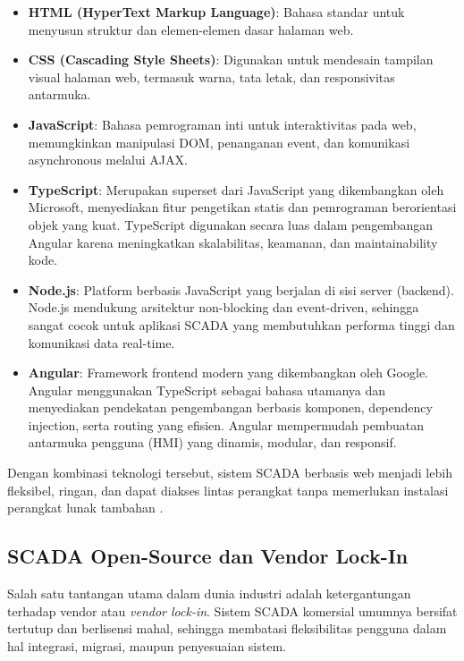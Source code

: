 \begin{itemize}
    \item \textbf{HTML (HyperText Markup Language)}: Bahasa standar untuk menyusun struktur dan elemen-elemen dasar halaman web.
    
    \item \textbf{CSS (Cascading Style Sheets)}: Digunakan untuk mendesain tampilan visual halaman web, termasuk warna, tata letak, dan responsivitas antarmuka.
    
    \item \textbf{JavaScript}: Bahasa pemrograman inti untuk interaktivitas pada web, memungkinkan manipulasi DOM, penanganan event, dan komunikasi asynchronous melalui AJAX.
    
    \item \textbf{TypeScript}: Merupakan superset dari JavaScript yang dikembangkan oleh Microsoft, menyediakan fitur pengetikan statis dan pemrograman berorientasi objek yang kuat. TypeScript digunakan secara luas dalam pengembangan Angular karena meningkatkan skalabilitas, keamanan, dan maintainability kode.
    
    \item \textbf{Node.js}: Platform berbasis JavaScript yang berjalan di sisi server (backend). Node.js mendukung arsitektur non-blocking dan event-driven, sehingga sangat cocok untuk aplikasi SCADA yang membutuhkan performa tinggi dan komunikasi data real-time.
    
    \item \textbf{Angular}: Framework frontend modern yang dikembangkan oleh Google. Angular menggunakan TypeScript sebagai bahasa utamanya dan menyediakan pendekatan pengembangan berbasis komponen, dependency injection, serta routing yang efisien. Angular mempermudah pembuatan antarmuka pengguna (HMI) yang dinamis, modular, dan responsif.
\end{itemize}

Dengan kombinasi teknologi tersebut, sistem SCADA berbasis web menjadi lebih fleksibel, ringan, dan dapat diakses lintas perangkat tanpa memerlukan instalasi perangkat lunak tambahan \parencite{seeed2024fuxa}.

\subsection{SCADA Open-Source dan Vendor Lock-In}
Salah satu tantangan utama dalam dunia industri adalah ketergantungan terhadap vendor atau \textit{vendor lock-in}. Sistem SCADA komersial umumnya bersifat tertutup dan berlisensi mahal, sehingga membatasi fleksibilitas pengguna dalam hal integrasi, migrasi, maupun penyesuaian sistem.

